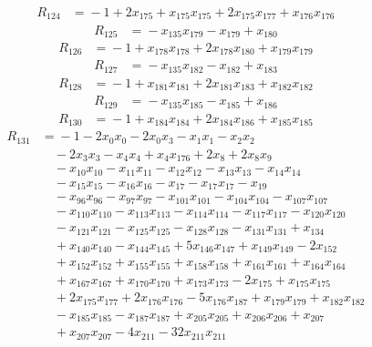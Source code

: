 \begin{align*}
R_{124}&={}-1 +2x_{175} +x_{175}x_{175} +2x_{175}x_{177} +x_{176}x_{176}
\end{align*}
\begin{align*}
R_{125}&={}-x_{135}x_{179} -x_{179} +x_{180}
\end{align*}
\begin{align*}
R_{126}&={}-1 +x_{178}x_{178} +2x_{178}x_{180} +x_{179}x_{179}
\end{align*}
\begin{align*}
R_{127}&={}-x_{135}x_{182} -x_{182} +x_{183}
\end{align*}
\begin{align*}
R_{128}&={}-1 +x_{181}x_{181} +2x_{181}x_{183} +x_{182}x_{182}
\end{align*}
\begin{align*}
R_{129}&={}-x_{135}x_{185} -x_{185} +x_{186}
\end{align*}
\begin{align*}
R_{130}&={}-1 +x_{184}x_{184} +2x_{184}x_{186} +x_{185}x_{185}
\end{align*}
\begin{align*}
R_{131}&={}-1 -2x_{0}x_{0} -2x_{0}x_{3} -x_{1}x_{1} -x_{2}x_{2}\\
&\quad{}-2x_{3}x_{3} -x_{4}x_{4} +x_{4}x_{176} +2x_{8} +2x_{8}x_{9}\\
&\quad{}-x_{10}x_{10} -x_{11}x_{11} -x_{12}x_{12} -x_{13}x_{13} -x_{14}x_{14}\\
&\quad{}-x_{15}x_{15} -x_{16}x_{16} -x_{17} -x_{17}x_{17} -x_{19}\\
&\quad{}-x_{96}x_{96} -x_{97}x_{97} -x_{101}x_{101} -x_{104}x_{104} -x_{107}x_{107}\\
&\quad{}-x_{110}x_{110} -x_{113}x_{113} -x_{114}x_{114} -x_{117}x_{117} -x_{120}x_{120}\\
&\quad{}-x_{121}x_{121} -x_{125}x_{125} -x_{128}x_{128} -x_{131}x_{131} +x_{134}\\
&\quad{}+x_{140}x_{140} -x_{144}x_{145} +5x_{146}x_{147} +x_{149}x_{149} -2x_{152}\\
&\quad{}+x_{152}x_{152} +x_{155}x_{155} +x_{158}x_{158} +x_{161}x_{161} +x_{164}x_{164}\\
&\quad{}+x_{167}x_{167} +x_{170}x_{170} +x_{173}x_{173} -2x_{175} +x_{175}x_{175}\\
&\quad{}+2x_{175}x_{177} +2x_{176}x_{176} -5x_{176}x_{187} +x_{179}x_{179} +x_{182}x_{182}\\
&\quad{}-x_{185}x_{185} -x_{187}x_{187} +x_{205}x_{205} +x_{206}x_{206} +x_{207}\\
&\quad{}+x_{207}x_{207} -4x_{211} -32x_{211}x_{211}
\end{align*}
